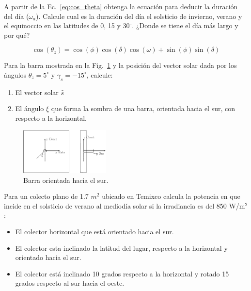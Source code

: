 \documentclass[spanish, letterpaper,12]{article}
\newenvironment{problem}[2][Problema]{\begin{trivlist}
\item[\hskip \labelsep {\bfseries #1}\hskip \labelsep {\bfseries #2.}]}{\end{trivlist}}
\begin{document}
\begin{problem}{3}
A partir de la Ec.~\ref{eq:cos_theta} obtenga la ecuación para deducir la duración del día ($\omega_a$). Calcule cual es la duración del día el solsticio de invierno, verano y el equinoccio en las latitudes de 0, 15 y 30$^{\circ}$. ¿Donde se tiene el día más largo y por qué?

  \begin{equation}
    \label{eq:cos_theta}
    \cos(\theta_z) = \cos(\phi) \cos(\delta) \cos(\omega) +
    \sin(\phi) \sin(\delta)
  \end{equation}
\end{problem}

\begin{problem}{4}
  Para la barra mostrada en la Fig.~\ref{fig:barra} y la posición del vector solar dada por los ángulos $\theta_{z} = 5^{\circ}$ y $\gamma_{s} = - 15^{\circ}$, calcule:
  \begin{enumerate}[label=(\alph*)]
   \item El vector solar $\hat s$
   \item El ángulo $\xi$ que forma la sombra de una barra, orientada hacia el sur, con respecto a la horizontal.
    \end{enumerate}
  \begin{figure}[ht]
    \centering
    \includegraphics[width=0.4\textwidth]{barra}
    \caption{\label{fig:barra} Barra orientada hacia el sur.}
  \end{figure}
\end{problem}

\begin{problem}{5}
Para un colecto plano de 1.7 $m^2$ ubicado en Temixco calcula la potencia en que incide en el solsticio de verano al mediodía solar si la irradiancia es del 850 W/m$^{2}$:

\begin{itemize}
\item El colector horizontal que está orientado hacia el sur.
\item El colector esta inclinado la latitud del lugar, respecto a la horizontal y orientado hacia el sur.
\item El colector está inclinado 10 grados respecto a la horizontal y rotado 15 grados respecto al sur hacia el oeste.
\end{itemize}

\end{problem}
\end{document}
